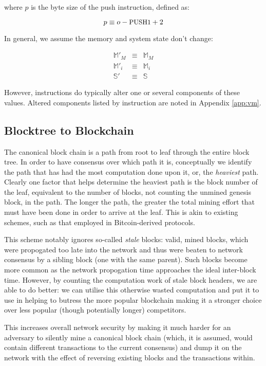 \documentclass[9pt,oneside]{amsart}
\begin{document}
\begin{multicols}{2}
where $p$ is the byte size of the push instruction, defined as:

\begin{equation}
p \equiv o - \text{\small PUSH1} + 2
\end{equation}

In general, we assume the memory and system state don't change:

\begin{eqnarray}
\mathbb{M}'_M & \equiv & \mathbb{M}_M \\
\mathbb{M}'_i & \equiv & \mathbb{M}_i \\
\mathbb{S}' & \equiv & \mathbb{S}
\end{eqnarray}

However, instructions do typically alter one or several components of these values. Altered components listed by instruction are noted in Appendix \ref{app:vm}.

\subsection{Blocktree to Blockchain} \label{ch:ghost}

The canonical block chain is a path from root to leaf through the entire block tree. In order to have consensus over which path it is, conceptually we identify the path that has had the most computation done upon it, or, the \textit{heaviest} path. Clearly one factor that helps determine the heaviest path is the block number of the leaf, equivalent to the number of blocks, not counting the unmined genesis block, in the path. The longer the path, the greater the total mining effort that must have been done in order to arrive at the leaf. This is akin to existing schemes, such as that employed in Bitcoin-derived protocols.

This scheme notably ignores so-called \textit{stale} blocks: valid, mined blocks, which were propogated too late into the network and thus were beaten to network consensus by a sibling block (one with the same parent). Such blocks become more common as the network propogation time approaches the ideal inter-block time. However, by counting the computation work of stale block headers, we are able to do better: we can utilise this otherwise wasted computation and put it to use in helping to butress the more popular blockchain making it a stronger choice over less popular (though potentially longer) competitors.

This increases overall network security by making it much harder for an adversary to silently mine a canonical block chain (which, it is assumed, would contain different transactions to the current consensus) and dump it on the network with the effect of reversing existing blocks and the transactions within.


\end{multicols}
\end{document}

